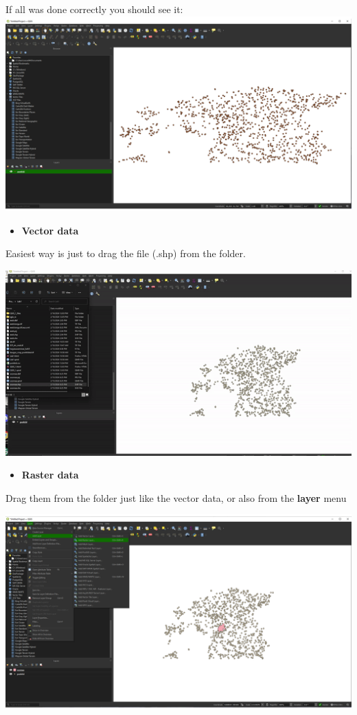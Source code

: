 \documentclass[
  letterpaper,
  DIV=11,
  numbers=noendperiod]{scrartcl}
\providecommand{\tightlist}{%
  \setlength{\itemsep}{0pt}\setlength{\parskip}{0pt}}\usepackage{longtable,booktabs,array}
\begin{document}
If all was done correctly you should see it:
\includegraphics{Lab1/qgis_ss/QGIS_ss5.png}

\begin{itemize}
\tightlist
\item
  \textbf{Vector data}
\end{itemize}

Easiest way is just to drag the file (.shp) from the folder.

\includegraphics{Lab1/qgis_ss/gif_1.gif}

\begin{itemize}
\tightlist
\item
  \textbf{Raster data}
\end{itemize}

Drag them from the folder just like the vector data, or also from the
\textbf{layer} menu

\includegraphics{Lab1/qgis_ss/QGIS_ss6.png}
\end{document}
